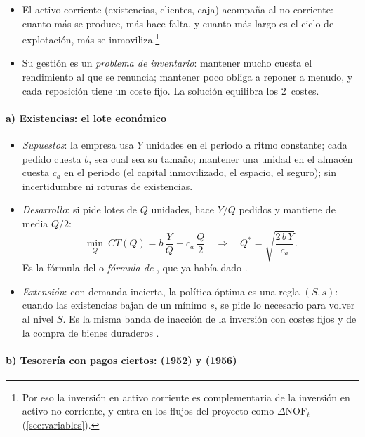 \documentclass[11pt]{article}
\begin{document}
\begin{itemize}
\item El activo corriente (existencias, clientes, caja) acompaña al no corriente: cuanto más se produce, más hace falta, y cuanto más largo es el ciclo de explotación, más se inmoviliza.\footnote{Por eso la inversión en activo corriente es complementaria de la inversión en activo no corriente, y entra en los flujos del proyecto como $\Delta\mathrm{NOF}_t$ (\ref{sec:variables}).}
\item Su gestión es un \emph{problema de inventario}: mantener mucho cuesta el rendimiento al que se renuncia; mantener poco obliga a reponer a menudo, y cada reposición tiene un coste fijo. La solución equilibra los 2~costes.
\end{itemize}

\paragraph{a) Existencias: el lote económico}

\begin{itemize}
\item \emph{Supuestos}: la empresa usa $Y$ unidades en el periodo a ritmo constante; cada pedido cuesta $b$, sea cual sea su tamaño; mantener una unidad en el almacén cuesta $c_a$ en el periodo (el capital inmovilizado, el espacio, el seguro); sin incertidumbre ni roturas de existencias.
\item \emph{Desarrollo}: si pide lotes de $Q$ unidades, hace $Y/Q$ pedidos y mantiene de media $Q/2$:
  \[
  \min_{Q}\ CT(Q)=b\,\frac{Y}{Q}+c_a\,\frac{Q}{2}\quad\Longrightarrow\quad Q^{*}=\sqrt{\frac{2\,b\,Y}{c_a}}.
  \]
  Es la fórmula del  o \emph{fórmula de }\nocite{Wilson1934Scientific}, que ya había dado \textcite{Harris1913How}.
\item \emph{Extensión}: con demanda incierta, la política óptima es una regla $(S,s)$: cuando las existencias bajan de un mínimo $s$, se pide lo necesario para volver al nivel $S$\nocite{ArrowHarrisMarschak1951Optimal,Scarf1960Optimality}. Es la misma banda de inacción de la inversión con costes fijos  y de la compra de bienes duraderos .
\end{itemize}

\paragraph{b) Tesorería con pagos ciertos:  (1952) y  (1956)}
\end{document}
